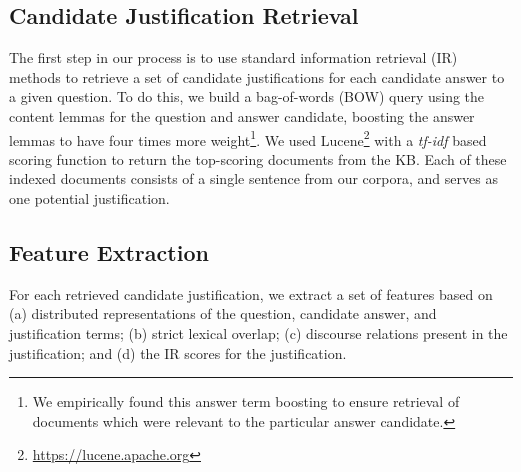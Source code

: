 %

\subsection{Candidate Justification Retrieval}
\label{sec-emnlp2017:justretrieval}
The first step in our process is to use standard information retrieval (IR) methods to retrieve a set of candidate justifications for each candidate answer to a given question.  To do this, we build a bag-of-words (BOW) query using the content lemmas for the question and answer candidate, boosting the answer lemmas to have four times more weight\footnote{We empirically found this answer term boosting to ensure retrieval of documents which were relevant to the particular answer candidate.}.  We used Lucene\footnote{\url{https://lucene.apache.org}} with a \emph{tf-idf} based scoring function to return the top-scoring documents from the KB.  Each of these indexed documents consists of a single sentence from our corpora, and serves as one potential justification.  

\subsection{Feature Extraction}
\label{sec-emnlp2017:features}
For each retrieved candidate justification, we extract a set of features based on (a) distributed representations of the question, candidate answer, and justification terms; (b) strict lexical overlap; (c) discourse relations present in the justification; and (d) the IR scores for the justification.

